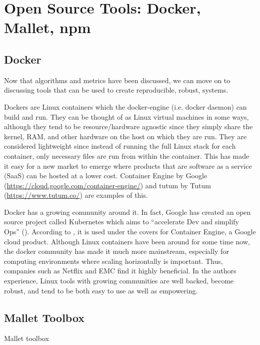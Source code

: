 



\section{Open Source Tools: Docker, Mallet, npm}

\subsection{Docker\*}
Now that algorithms and metrics have been discussed, we can move on to discussing tools that can be used to create reproducible, robust, systems.

Dockers are Linux containers which the docker-engine (i.e. docker daemon) can build and run. They can be thought of as Linux virtual machines in some ways, although they tend to be resource/hardware agnostic since they simply share the kernel, RAM, and other hardware on the host on which they are run. They are considered lightweight since instead of running the full Linux stack for each container, only necessary files are run from within the container. This has made it easy for a new market to emerge where products that are software as a service (SaaS) can be hosted at a lower cost. Container Engine by Google (\url{https://cloud.google.com/container-engine/}) and tutum by Tutum (\url{https://www.tutum.co/}) are examples of this.

Docker has a growing community around it. In fact, Google has created an open source project called Kubernetes which aims to ``accelerate Dev and simplify Ops'' (\citealp{kube_website}). According to \cite{google_container_engine}, it is used under the covers for Container Engine, a Google cloud product. Although Linux containers have been around for some time now, the docker community has made it much more mainstream, especially for computing environments where scaling horizontally is important. Thus, companies such as Netflix and EMC find it highly beneficial. In the authors experience, Linux tools with growing communities are well backed, become robust, and tend to be both easy to use as well as empowering.

\subsection{Mallet Toolbox}
Mallet toolbox

